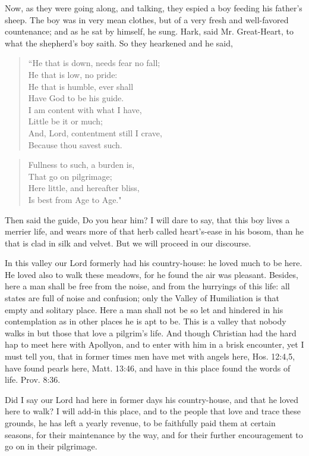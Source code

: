 Now, as they were going along, and talking, they espied a boy feeding his father's sheep. The boy was in very mean clothes, but of a very fresh and well-favored countenance; and as he sat by himself, he sung. Hark, said Mr. Great-Heart, to what the shepherd's boy saith. So they hearkened and he said,
\begin{verse}
``He that is down, needs fear no fall;\\
He that is low, no pride:\\
He that is humble, ever shall\\
Have God to be his guide.\\
I am content with what I have,\\
Little be it or much;\\
And, Lord, contentment still I crave,\\
Because thou savest such.\\
\end{verse}
\begin{verse}
Fullness to such, a burden is,\\
That go on pilgrimage;\\
Here little, and hereafter bliss,\\
Is best from Age to Age."\\
\end{verse}

Then said the guide, Do you hear him? I will dare to say, that this boy lives a merrier life, and wears more of that herb called heart's-ease in his bosom, than he that is clad in silk and velvet. But we will proceed in our discourse.

In this valley our Lord formerly had his country-house: he loved much to be here. He loved also to walk these meadows, for he found the air was pleasant. Besides, here a man shall be free from the noise, and from the hurryings of this life: all states are full of noise and confusion; only the Valley of Humiliation is that empty and solitary place. Here a man shall not be so let and hindered in his contemplation as in other places he is apt to be. This is a valley that nobody walks in but those that love a pilgrim's life. And though Christian had the hard hap to meet here with Apollyon, and to enter with him in a brisk encounter, yet I must tell you, that in former times men have met with angels here, Hos. 12:4,5, have found pearls here, Matt. 13:46, and have in this place found the words of life. Prov. 8:36.

Did I say our Lord had here in former days his country-house, and that he loved here to walk? I will add-in this place, and to the people that love and trace these grounds, he has left a yearly revenue, to be faithfully paid them at certain seasons, for their maintenance by the way, and for their further encouragement to go on in their pilgrimage.

